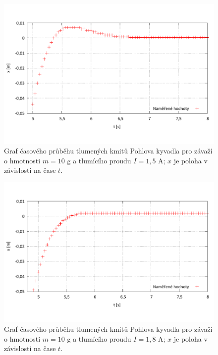\documentclass[english]{article}
\begin{document}
	\begin{figure}[h]
	\begin{center}
	\vspace*{-1cm}
		\includegraphics[width=\linewidth]{../gnuplot/10_pohl_dekr_16_10g.pdf}
	\vspace*{-2cm}
			\caption{Graf časového průběhu tlumených kmitů Pohlova kyvadla pro závaží o hmotnosti $m=10$ g a tlumícího proudu $I = 1,5$ A; $x$ je poloha v závislosti na čase $t$.}
			\label{fig:pohl_dekr_16}
	\end{center}
	\end{figure}
	
	\begin{figure}[h!]
	\begin{center}
	\vspace*{-1cm}
		\includegraphics[width=\linewidth]{../gnuplot/10_pohl_dekr_18_10g.pdf}
	\vspace*{-2cm}
			\caption{Graf časového průběhu tlumených kmitů Pohlova kyvadla pro závaží o hmotnosti $m=10$ g a tlumícího proudu $I = 1,8$ A; $x$ je poloha v závislosti na čase $t$.}
			\label{fig:pohl_dekr_18}
	\end{center}
	\end{figure}
	
\end{document}
